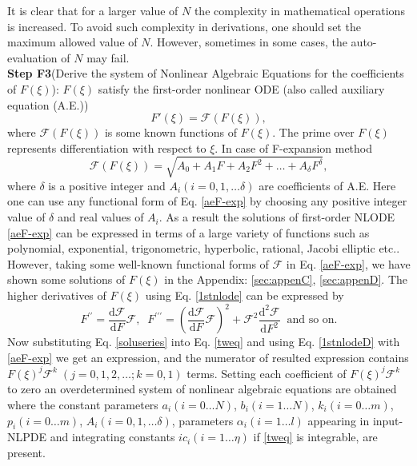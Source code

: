 \documentclass[prd,aps,floats,showkeys,nofootinbib,notitlepage]{revtex4-2}
\begin{document}
	It is clear that for a larger value of $N$ the complexity in mathematical operations is increased. To avoid such complexity in derivations, one should set the maximum allowed value of $N$. However, sometimes in some cases, the auto-evaluation of $N$ may fail. \\
	
	
	\textbf{Step F3}(Derive the system of Nonlinear Algebraic Equations for the coefficients of $F(\xi)$):
	$F(\xi)$ satisfy the first-order nonlinear ODE (also called auxiliary equation (A.E.))
	\begin{equation}\label{1stnlode}
		{F'\left( \xi  \right)} = \mathcal{F}(F(\xi)),
	\end{equation}
	where $\mathcal{F}(F(\xi))$ is some known functions of $F(\xi)$. The prime over $F(\xi)$ represents differentiation with respect to $\xi$. In case of F-expansion method
	\begin{equation} \label{aeF-exp}
		\mathcal{F}(F(\xi)) = \sqrt{{A_0} + {A_1}F + {A_2}{F^2} +  \ldots + {A_\delta }{F^\delta }},
	\end{equation}
	where $\delta$ is a positive integer and $A_i(i=0,1,\ldots \delta)$ are coefficients of A.E. Here one can use any functional form of Eq. \eqref{aeF-exp} by choosing any positive integer value of $\delta$ and real values of $A_i$. As a result the solutions of first-order NLODE \eqref{aeF-exp} can be expressed in terms of a large variety of functions such as polynomial, exponential, trigonometric, hyperbolic, rational, Jacobi elliptic etc.. 
	However, taking some well-known functional forms of $\mathcal{F}$ in Eq. \eqref{aeF-exp}, we have shown some solutions of $F(\xi)$ in the Appendix: \ref{sec:appenC}, \ref{sec:appenD}. The higher derivatives of $F(\xi)$ using Eq. \eqref{1stnlode} can be expressed by
	\begin{equation}\label{1stnlodeD}
		F^{\prime\prime}= \frac{\mathrm{d} \mathcal{F} }{\mathrm{d}F}\mathcal{F},\;\;F^{\prime\prime\prime}=\left(\frac{\mathrm{d} \mathcal{F} }{\mathrm{d}F}\mathcal{F}\right)^2+\mathcal{F}^2\frac{\mathrm{d^2} \mathcal{F} }{\mathrm{d}F^2}\;\; \text{and so on.}
	\end{equation}
	Now substituting Eq. \eqref{soluseries} into Eq. \eqref{tweq} and using Eq. \eqref{1stnlodeD} with \eqref{aeF-exp} we get an expression, and the numerator of resulted expression contains $F(\xi)^j{\mathcal{F}}^k\;(j=0,1,2,\ldots;k=0,1)$ terms. Setting each coefficient of $F(\xi)^j{\mathcal{F}}^k$ to zero an overdetermined system of nonlinear algebraic equations are obtained where the constant parameters $a_i(i=0\ldots N)$, $b_i(i=1\ldots N)$, $k_i(i=0\ldots m)$, $p_i(i=0\ldots m)$, $A_i(i=0,1,\ldots \delta)$, parameters $\alpha_i(i=1\ldots l)$ appearing in input-NLPDE and integrating constants $ic_i(i=1\ldots \eta)$ if \eqref{tweq} is integrable, are present. 
	
\end{document}

